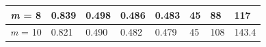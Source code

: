 \documentclass{article}
\begin{document}
\begin{table}[hbt!]
\begin{tabular}{|c|l|l|l|l|l|l|p{2cm}|}
{ \textit{m} = 8}                & { 0.839}                                        & { 0.498}                                & { 0.486}                                & { 0.483}                                & { 45}                                  & { 88 }                               & { 117 }                                  \\ \hline
{ \textit{m} = 10}               & { 0.821}                                        & { 0.490}                                & { 0.482}                                & { 0.479}                                & { 45}                                  & { 108 }                              & { 143.4 }                                \\ \hline
\end{tabular}
\end{table}
\end{document}
